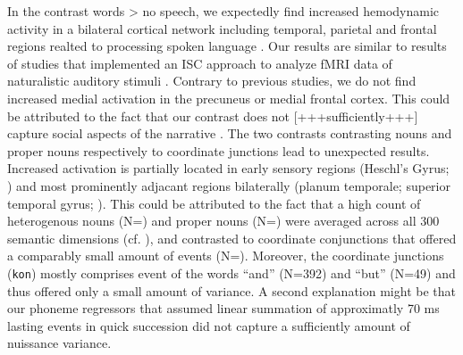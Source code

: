 \documentclass[10pt,a4paper,onecolumn]{article}
\begin{document}
In the contrast words > no speech, we expectedly find increased hemodynamic activity in a bilateral cortical network including temporal, parietal and frontal regions realted to processing spoken language \citep{friederici2011brain, hickok2007cortical,price2012twentyyears}.
Our results are similar to results of studies that implemented an ISC approach to analyze fMRI data of naturalistic auditory stimuli \citep{honey2012not, lerner2011topographic, silbert2014coupled}.
Contrary to previous studies, we do not find increased medial activation in the precuneus or medial frontal cortex. This could be attributed to the fact that our contrast does not [+++sufficiently+++] capture social aspects of the narrative \citep{ferstl2008extended, mar2011neural}.
The two contrasts contrasting nouns and proper nouns respectively to coordinate junctions lead to unexpected results. Increased activation is partially located in early sensory regions (Heschl's Gyrus; \citep{saenz2014tonotopic}) and most prominently adjacant regions bilaterally (planum temporale; superior temporal gyrus; \citep{arsenault2015distributed, mesgarani2014phonetic}).
This could be attributed to the fact that a high count of heterogenous nouns (N=\rNnAll) and proper nouns (N=\rNeAll) were averaged across all 300 semantic dimensions (cf. \citep{mitchell2008predicting, huth2016natural}), and contrasted to coordinate conjunctions that offered a comparably small amount of events (N=\rKonAll).
Moreover, the coordinate junctions (\texttt{kon}) mostly comprises event of the words ``and'' (N=392) and ``but'' (N=49) and thus offered only a small amount of variance.
A second explanation might be that our phoneme regressors that assumed linear summation of approximatly 70 ms lasting events in quick succession did not capture a sufficiently amount of nuissance variance.
\end{document}
